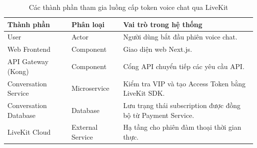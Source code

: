 \begin{table}[H]
\centering
\renewcommand{\arraystretch}{1.3}

\begin{tabular}{|l|l|p{5cm}|}
\hline
\textbf{Thành phần} & \textbf{Phân loại} & \textbf{Vai trò trong hệ thống} \\ \hline
User & Actor & Người dùng bắt đầu phiên voice chat. \\ \hline
Web Frontend & Component & Giao diện web Next.js. \\ \hline
API Gateway (Kong) & Component & Cổng API chuyển tiếp các yêu cầu API. \\ \hline
Conversation Service & Microservice & Kiểm tra VIP và tạo Access Token bằng LiveKit SDK. \\ \hline
Conversation Database & Database & Lưu trạng thái subscription được đồng bộ từ Payment Service. \\ \hline
LiveKit Cloud & External Service & Hạ tầng cho phiên đàm thoại thời gian thực. \\ \hline
\end{tabular}
\caption{Các thành phần tham gia luồng cấp token voice chat qua LiveKit}
\end{table}
